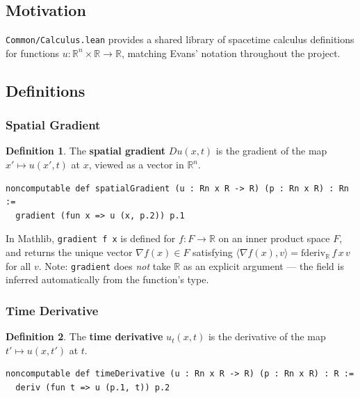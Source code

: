 ﻿\documentclass[12pt, a4paper]{article}
\renewcommand{\_}{\origunderscore\allowbreak}
\theoremstyle{definition}
\newtheorem{definition}{Definition}[section]
\theoremstyle{plain}
\begin{document}
\subsection{Motivation}

\texttt{Common/\allowbreak Calculus.\allowbreak lean} provides a shared library of spacetime calculus definitions
for functions $u : \mathbb{R}^n \times \mathbb{R} \to \mathbb{R}$, matching Evans'
notation throughout the project.

\subsection{Definitions}

\subsubsection{Spatial Gradient}

\begin{definition}
The \textbf{spatial gradient} $Du(x,t)$ is the gradient of the map
$x' \mapsto u(x', t)$ at $x$, viewed as a vector in $\mathbb{R}^n$.
\end{definition}

\begin{lstlisting}[caption={Spatial gradient in Lean}]
noncomputable def spatialGradient (u : Rn x R -> R) (p : Rn x R) : Rn :=
  gradient (fun x => u (x, p.2)) p.1
\end{lstlisting}

In Mathlib, \texttt{gradient f x} is defined for $f : F \to \mathbb{R}$ on an
inner product space $F$, and returns the unique vector $\nabla f(x) \in F$
satisfying $\langle \nabla f(x), v \rangle = \text{fderiv}_{\mathbb{R}}\, f\, x\, v$
for all $v$. Note: \texttt{gradient} does \emph{not} take $\mathbb{R}$ as an
explicit argument --- the field is inferred automatically from the function's type.

\subsubsection{Time Derivative}

\begin{definition}
The \textbf{time derivative} $u_t(x,t)$ is the derivative of the map
$t' \mapsto u(x, t')$ at $t$.
\end{definition}

\begin{lstlisting}[caption={Time derivative in Lean}]
noncomputable def timeDerivative (u : Rn x R -> R) (p : Rn x R) : R :=
  deriv (fun t => u (p.1, t)) p.2
\end{lstlisting}
\end{document}
